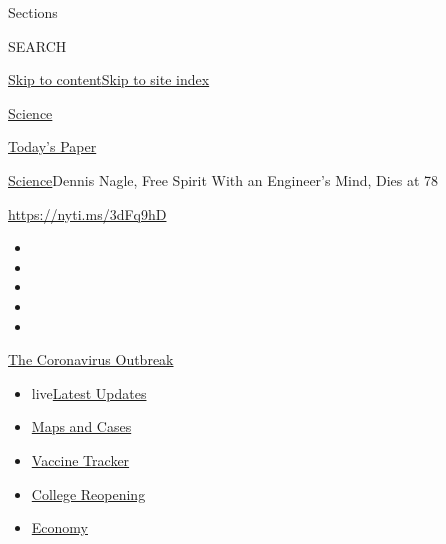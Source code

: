 Sections

SEARCH

\protect\hyperlink{site-content}{Skip to
content}\protect\hyperlink{site-index}{Skip to site index}

\href{https://www.nytimes3xbfgragh.onion/section/science}{Science}

\href{https://myaccount.nytimes3xbfgragh.onion/auth/login?response_type=cookie\&client_id=vi}{}

\href{https://www.nytimes3xbfgragh.onion/section/todayspaper}{Today's
Paper}

\href{/section/science}{Science}\textbar{}Dennis Nagle, Free Spirit With
an Engineer's Mind, Dies at 78

\url{https://nyti.ms/3dFq9hD}

\begin{itemize}
\item
\item
\item
\item
\item
\end{itemize}

\href{https://www.nytimes3xbfgragh.onion/news-event/coronavirus?action=click\&pgtype=Article\&state=default\&region=TOP_BANNER\&context=storylines_menu}{The
Coronavirus Outbreak}

\begin{itemize}
\tightlist
\item
  live\href{https://www.nytimes3xbfgragh.onion/2020/08/04/world/coronavirus-covid-19.html?action=click\&pgtype=Article\&state=default\&region=TOP_BANNER\&context=storylines_menu}{Latest
  Updates}
\item
  \href{https://www.nytimes3xbfgragh.onion/interactive/2020/us/coronavirus-us-cases.html?action=click\&pgtype=Article\&state=default\&region=TOP_BANNER\&context=storylines_menu}{Maps
  and Cases}
\item
  \href{https://www.nytimes3xbfgragh.onion/interactive/2020/science/coronavirus-vaccine-tracker.html?action=click\&pgtype=Article\&state=default\&region=TOP_BANNER\&context=storylines_menu}{Vaccine
  Tracker}
\item
  \href{https://www.nytimes3xbfgragh.onion/2020/08/02/us/covid-college-reopening.html?action=click\&pgtype=Article\&state=default\&region=TOP_BANNER\&context=storylines_menu}{College
  Reopening}
\item
  \href{https://www.nytimes3xbfgragh.onion/live/2020/08/03/business/stock-market-today-coronavirus?action=click\&pgtype=Article\&state=default\&region=TOP_BANNER\&context=storylines_menu}{Economy}
\end{itemize}


